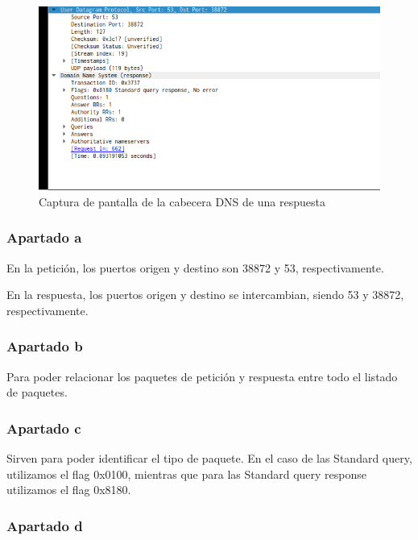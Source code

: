 \documentclass[spanish]{report} %
\begin{document}
\begin{figure}[h]
\begin{center}
\includegraphics[scale=.5]{../img/8.png}
\end{center}
\caption{Captura de pantalla de la cabecera DNS de una respuesta}
\end{figure}

\newpage

\subsubsection{Apartado a}

En la petición, los puertos origen y destino son 38872 y 53,
respectivamente.\newline

En la respuesta, los puertos origen y destino se intercambian, siendo 53 y
38872, respectivamente.

\subsubsection{Apartado b}

Para poder relacionar los paquetes de petición y respuesta entre todo el listado
de paquetes.

\subsubsection{Apartado c}

Sirven para poder identificar el tipo de paquete. En el caso de las Standard
query, utilizamos el flag 0x0100, mientras que para las Standard query response
utilizamos el flag 0x8180.

\subsubsection{Apartado d}
\end{document}
